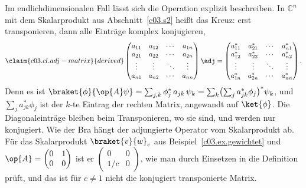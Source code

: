 Im endlichdimensionalen Fall lässt sich die Operation explizit beschreiben. In $\mathbb{C}^n$
mit dem Skalarprodukt aus Abschnitt~\ref{c03.s2} heißt das Kreuz: erst transponieren, dann alle
Einträge komplex konjugieren,
\begin{equation}\label{c03.eq.adj-matrix}\claim{c03.cl.adj-matrix}{derived}
  \begin{pmatrix}
    a_{11} & a_{12} & \cdots & a_{1n} \\
    a_{21} & a_{22} & \cdots & a_{2n} \\
    \vdots & \vdots & \ddots & \vdots \\
    a_{n1} & a_{n2} & \cdots & a_{nn}
  \end{pmatrix}\adj
  =
  \begin{pmatrix}
    a_{11}^* & a_{21}^* & \cdots & a_{n1}^* \\
    a_{12}^* & a_{22}^* & \cdots & a_{n2}^* \\
    \vdots & \vdots & \ddots & \vdots \\
    a_{1n}^* & a_{2n}^* & \cdots & a_{nn}^*
  \end{pmatrix} .
\end{equation}
Denn es ist
$\braket{\phi}{\op{A}\psi} = \sum_{j,k} \phi_j^*\, a_{jk}\, \psi_k = \sum_k \bigl( \sum_j a_{jk}^* \phi_j \bigr)^* \psi_k$,
und $\sum_j a_{jk}^* \phi_j$ ist der $k$-te Eintrag der rechten Matrix, angewandt auf
$\ket{\phi}$. Die Diagonaleinträge bleiben beim Transponieren, wo sie sind, und werden nur
konjugiert. Wie der Bra hängt der adjungierte Operator vom Skalarprodukt ab. Für das
Skalarprodukt $\braket{v}{w}_c$ aus Beispiel~\ref{c03.ex.gewichtet} und
$\op{A} = \begin{pmatrix} 0 & 1 \\ 0 & 0 \end{pmatrix}$ ist er
$\begin{pmatrix} 0 & 0 \\ 1/c & 0 \end{pmatrix}$, wie man durch Einsetzen in die Definition
prüft, und das ist für $c \neq 1$ nicht die konjugiert transponierte Matrix.

